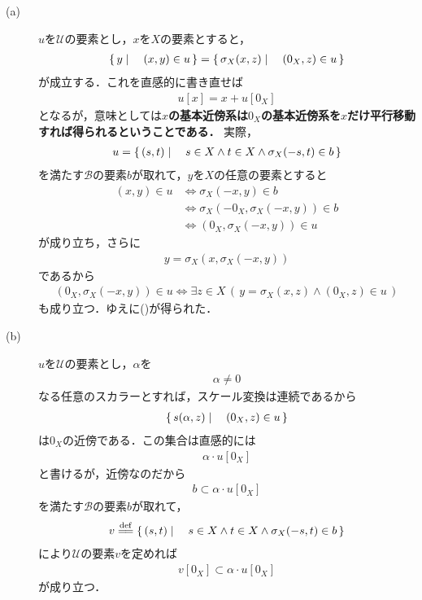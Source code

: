 	\begin{description}
		\item[(a)] $u$を$\mathscr{U}$の要素とし，$x$を$X$の要素とすると，
			\begin{align}
				\left\{\, y \mid \quad (x,y) \in u\, \right\} = \left\{\, \sigma_X(x,z) \mid \quad (0_X,z) \in u\, \right\}
				\label{fom:pre_thm_entourages_introducing_vector_topology_1}
			\end{align}
			が成立する．これを直感的に書き直せば
			\begin{align}
				u[x] = x + u[0_X]
			\end{align}
			となるが，意味としては{\bf $x$の基本近傍系は$0_X$の基本近傍系を$x$だけ平行移動すれば得られるということである．}
			実際，
			\begin{align}
				u = \left\{\, (s,t) \mid \quad s \in X \wedge t \in X \wedge \sigma_X(-s,t) \in b\, \right\}
			\end{align}
			を満たす$\mathscr{B}$の要素$b$が取れて，$y$を$X$の任意の要素とすると
			\begin{align}
				(x,y) \in u &\Longleftrightarrow \sigma_X\left(-x,y\right) \in b \\
				&\Longleftrightarrow \sigma_X\left(-0_X,\sigma_X\left(-x,y\right)\right) \in b \\
				&\Longleftrightarrow \left(0_X,\sigma_X\left(-x,y\right)\right) \in u
			\end{align}
			が成り立ち，さらに
			\begin{align}
				y = \sigma_X\left(x,\sigma_X\left(-x,y\right)\right)
			\end{align}
			であるから
			\begin{align}
				\left(0_X,\sigma_X\left(-x,y\right)\right) \in u
				\Longleftrightarrow \exists z \in X\, \left(\, y=\sigma_X\left(x,z\right) 
				\wedge \left(0_X,z\right) \in u\, \right)
			\end{align}
			も成り立つ．ゆえに()が得られた．
		
		\item[(b)] $u$を$\mathscr{U}$の要素とし，$\alpha$を
			\begin{align}
				\alpha \neq 0
			\end{align}
			なる任意のスカラーとすれば，スケール変換は連続であるから
			\begin{align}
				\left\{\, s(\alpha,z) \mid \quad (0_X,z) \in u\, \right\}
			\end{align}
			は$0_X$の近傍である．この集合は直感的には
			\begin{align}
				\alpha \cdot u[0_X]
			\end{align}
			と書けるが，近傍なのだから
			\begin{align}
				b \subset \alpha \cdot u[0_X]
			\end{align}
			を満たす$\mathscr{B}$の要素$b$が取れて，
			\begin{align}
				v \defeq \Set{(s,t)}{s \in X \wedge t \in X \wedge \sigma_X(-s,t) \in b}
			\end{align}
			により$\mathscr{U}$の要素$v$を定めれば
			\begin{align}
				v[0_X] \subset \alpha \cdot u[0_X]
			\end{align}
			が成り立つ．
			

\end{description}

